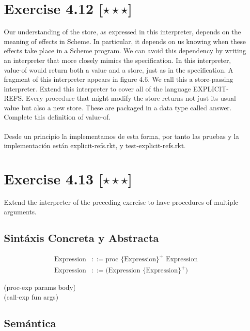 \documentclass[11pt]{article}
\begin{document}
\section*{Exercise 4.12 [$\star \star \star$]}
Our understanding of the store, as expressed in this interpreter,
depends on the meaning of effects in Scheme. In particular, it depends on us knowing
when these effects take place in a Scheme program. We can avoid this dependency by
writing an interpreter that more closely mimics the speciﬁcation. In this interpreter,
value-of would return both a value and a store, just as in the speciﬁcation. A fragment of this interpreter appears in ﬁgure 4.6. We call this a store-passing interpreter.
Extend this interpreter to cover all of the language EXPLICIT-REFS.
Every procedure that might modify the store returns not just its usual value but also a
new store. These are packaged in a data type called answer. Complete this deﬁnition
of value-of. \\ \\

\noindent Desde un principio la implementamos de esta forma, por tanto las pruebas y la implementación están explicit-refs.rkt, y test-explicit-refs.rkt.

\section*{Exercise 4.13 [$\star \star \star$]}
Extend the interpreter of the preceding exercise to have procedures of multiple arguments.
\subsection*{Sintáxis Concreta y Abstracta}
\begin{align*}
\text{Expression} &::= \text{proc \{Expression\}}^+\text{ Expression} \\
\text{Expression} &::= \text{(Expression \{Expression\}}^+\text{)}
\end{align*}

\begin{center}
(proc-exp params body) \\
(call-exp fun args)
\end{center}

\subsection*{Semántica}
\end{document}
